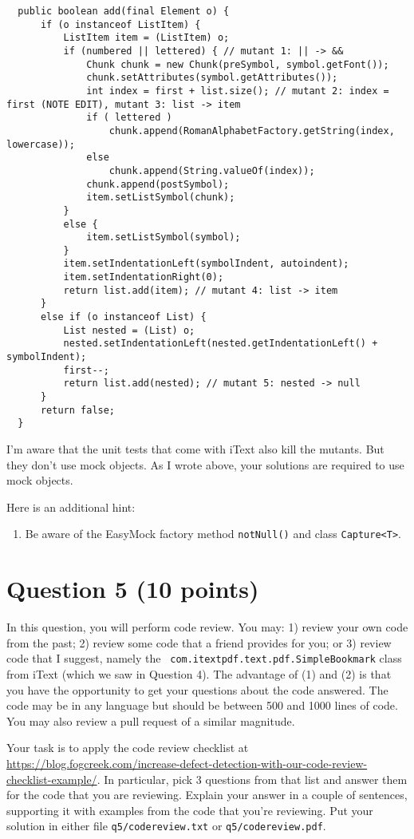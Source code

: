 \documentclass[10pt,hidelinks]{article}
\begin{document}
{\scriptsize
\begin{lstlisting}
  public boolean add(final Element o) {
      if (o instanceof ListItem) {
          ListItem item = (ListItem) o;
          if (numbered || lettered) { // mutant 1: || -> &&
              Chunk chunk = new Chunk(preSymbol, symbol.getFont());
              chunk.setAttributes(symbol.getAttributes());
              int index = first + list.size(); // mutant 2: index = first (NOTE EDIT), mutant 3: list -> item
              if ( lettered )
                  chunk.append(RomanAlphabetFactory.getString(index, lowercase));
              else
                  chunk.append(String.valueOf(index));
              chunk.append(postSymbol);
              item.setListSymbol(chunk);
          }
          else {
              item.setListSymbol(symbol);
          }
          item.setIndentationLeft(symbolIndent, autoindent);
          item.setIndentationRight(0);
          return list.add(item); // mutant 4: list -> item
      }
      else if (o instanceof List) {
          List nested = (List) o;
          nested.setIndentationLeft(nested.getIndentationLeft() + symbolIndent);
          first--;
          return list.add(nested); // mutant 5: nested -> null
      }
      return false;
  }
\end{lstlisting}
}
I'm aware that the unit tests that come with iText also kill the mutants. But they don't use mock objects. As I wrote above, your solutions are required to use mock objects.

\vspace*{1em}\noindent
Here is an additional hint:

\begin{enumerate}
\item Be aware of the EasyMock factory method \verb+notNull()+ and class \verb+Capture<T>+.
\end{enumerate}

\section*{Question 5 (10 points)}
In this question, you will perform code review. You may: 1) review
your own code from the past; 2) review some code that a friend
provides for you; or 3) review code that I suggest, namely the {\tt
  com.itextpdf.text.pdf.SimpleBookmark} class from iText (which we saw
in Question 4). The advantage of (1) and (2) is that you have the
opportunity to get your questions about the code answered. The code
may be in any language but should be between 500 and 1000 lines of
code. You may also review a pull request of a similar magnitude.

Your task is to apply the code review checklist at
\url{https://blog.fogcreek.com/increase-defect-detection-with-our-code-review-checklist-example/}. In
particular, pick 3 questions from that list and answer them for the
code that you are reviewing. Explain your answer in a couple of
sentences, supporting it with examples from the code that you're
reviewing. Put your solution in either file {\tt q5/codereview.txt}
or {\tt q5/codereview.pdf}. 



\end{document}
